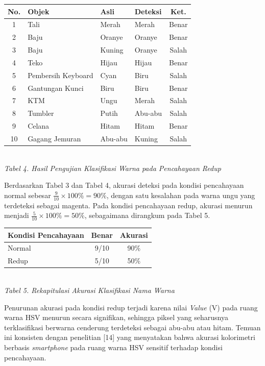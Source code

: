 \begin{table}[H]
  \centering
  {\scriptsize
  \begin{tabular}{|c|l|l|l|c|}
    \hline
    \textbf{No.} & \textbf{Objek} & \textbf{Asli} & \textbf{Deteksi} & \textbf{Ket.} \\
    \hline
    1 & Tali & Merah & Merah & Benar \\ \hline
    2 & Baju & Oranye & Oranye & Benar \\ \hline
    3 & Baju & Kuning & Oranye & Salah \\ \hline
    4 & Teko & Hijau & Hijau & Benar \\ \hline
    5 & Pembersih Keyboard & Cyan & Biru & Salah \\ \hline
    6 & Gantungan Kunci & Biru & Biru & Benar \\ \hline
    7 & KTM & Ungu & Merah & Salah \\ \hline
    8 & Tumbler & Putih & Abu-abu & Salah \\ \hline
    9 & Celana & Hitam & Hitam & Benar \\ \hline
    10 & Gagang Jemuran & Abu-abu & Kuning & Salah \\ \hline
  \end{tabular}}\\[0.3em]
  {\footnotesize\textit{Tabel 4. Hasil Pengujian Klasifikasi Warna pada Pencahayaan Redup}}
\end{table}

Berdasarkan Tabel 3 dan Tabel 4, akurasi deteksi pada kondisi pencahayaan normal sebesar $\frac{9}{10} \times 100\% = 90\%$, dengan satu kesalahan pada warna ungu yang terdeteksi sebagai magenta. Pada kondisi pencahayaan redup, akurasi menurun menjadi $\frac{5}{10} \times 100\% = 50\%$, sebagaimana dirangkum pada Tabel 5.

\begin{table}[H]
  \centering
  {\footnotesize
  \begin{tabular}{|l|c|c|}
    \hline
    \textbf{Kondisi Pencahayaan} & \textbf{Benar} & \textbf{Akurasi} \\
    \hline
    Normal & 9/10 & 90\% \\ \hline
    Redup & 5/10 & 50\% \\ \hline
  \end{tabular}}\\[0.3em]
  {\footnotesize\textit{Tabel 5. Rekapitulasi Akurasi Klasifikasi Nama Warna}}
\end{table}

Penurunan akurasi pada kondisi redup terjadi karena nilai \textit{Value} (V) pada ruang warna HSV menurun secara signifikan, sehingga piksel yang seharusnya terklasifikasi berwarna cenderung terdeteksi sebagai abu-abu atau hitam. Temuan ini konsisten dengan penelitian [14] yang menyatakan bahwa akurasi kolorimetri berbasis \textit{smartphone} pada ruang warna HSV sensitif terhadap kondisi pencahayaan.

